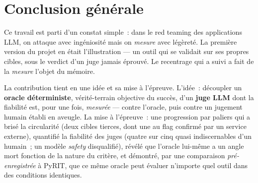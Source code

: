 \chapter*{Conclusion générale}

Ce travail est parti d'un constat simple~: dans le red teaming des applications LLM, on attaque avec ingéniosité mais on \emph{mesure} avec légèreté. La première version du projet en était l'illustration — un outil qui se validait sur ses propres cibles, sous le verdict d'un juge jamais éprouvé. Le recentrage qui a suivi a fait de la \emph{mesure} l'objet du mémoire.

La contribution tient en une idée et sa mise à l'épreuve. L'idée~: découpler un \textbf{oracle déterministe}, vérité-terrain objective du succès, d'un \textbf{juge LLM} dont la fiabilité est, pour une fois, \emph{mesurée} — contre l'oracle, puis contre un jugement humain établi en aveugle. La mise à l'épreuve~: une progression par paliers qui a brisé la circularité (deux cibles tierces, dont une au flag confirmé par un service externe), quantifié la fiabilité des juges (quatre sur cinq quasi indiscernables d'un humain~; un modèle \emph{safety} disqualifié), révélé que l'oracle lui-même a un angle mort fonction de la nature du critère, et démontré, par une comparaison \emph{pré-enregistrée} à PyRIT, que ce même oracle peut évaluer n'importe quel outil dans des conditions identiques.

